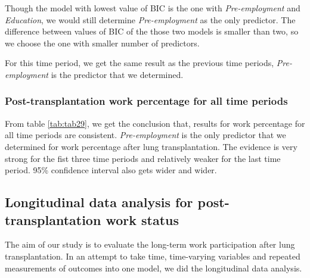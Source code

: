 \documentclass[11pt, a4paper]{article}\usepackage[]{graphicx}\usepackage[]{color}
\begin{document}
{Though the model with lowest value of BIC is the one with \textit{Pre-employment} and \textit{Education}, we would still determine \textit{Pre-employment} as the only predictor. The difference between values of BIC of the those two models is smaller than two, so we choose the one with smaller number of predictors.

For this time period, we get the same result as the previous time periods, \textit{Pre-employment} is the predictor that we determined.

\clearpage
\subsubsection*{Post-transplantation work percentage for all time periods} \label{subsubsection:linear5}




\begin{table}[ht]
\centering
\caption{Result for linear regression  for periods after LTx} 
\label{tab:tab29}
\end{table}


From table \ref{tab:tab29}, we get the conclusion that, results for work percentage for all time periods are consistent. \textit{Pre-employment} is the only predictor that we determined for work percentage after lung transplantation. The evidence is very strong for the fist three time periods and relatively weaker for the last time period. 95\% confidence interval also gets wider and wider.



\clearpage
\subsection*{Longitudinal data analysis for post-transplantation work status} \label{subsec:LDA}
The aim of our study is to evaluate the long-term work participation after lung transplantation. In an attempt to take time, time-varying variables and repeated measurements of outcomes into one model, we did the longitudinal data analysis.

}
\end{document}
